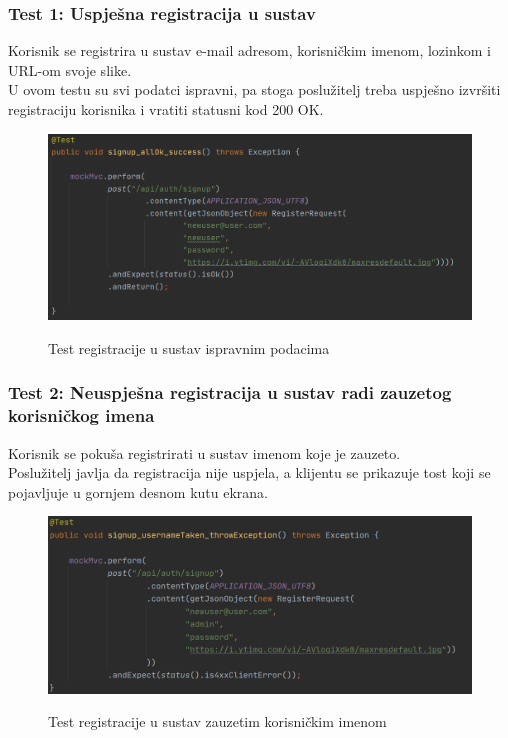 			\subsubsection{Test 1: Uspješna registracija u sustav}
			Korisnik se registrira u sustav e-mail adresom, korisničkim imenom, lozinkom i URL-om svoje slike. \\
			U ovom testu su svi podatci ispravni, pa stoga poslužitelj treba uspješno izvršiti registraciju korisnika i vratiti statusni kod 200 OK.
			
			\begin{figure}[H]
				\centering
				\includegraphics[scale=0.75]{slike/test1} \\
				\caption{ Test registracije u sustav ispravnim podacima}
				\label{fig:test1}
			\end{figure}
		
		
			\subsubsection{Test 2: Neuspješna registracija u sustav radi zauzetog korisničkog imena}
			Korisnik se pokuša registrirati u sustav imenom koje je zauzeto. \\
			Poslužitelj javlja da registracija nije uspjela,
			a klijentu se prikazuje tost koji se pojavljuje u gornjem desnom kutu ekrana.
			
			\begin{figure}[H]
				\centering
				\includegraphics[scale=0.75]{slike/test2} \\
				\caption{ Test registracije u sustav zauzetim korisničkim imenom}
				\label{fig:test2}
			\end{figure}
		
